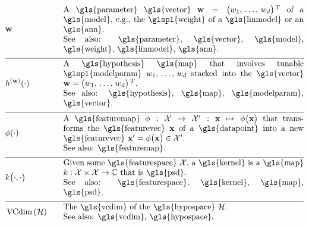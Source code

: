 \begin{align} 
	&\weights  &\quad & \parbox{.85\textwidth}{A \gls{parameter} \gls{vector} $\weights = \big(\weight_{1}, \,\ldots, \,\weight_{\featuredim}\big)\,^{T}$ 
		of a \gls{model}, e.g., the \glspl{weight} of a \gls{linmodel} or an \gls{ann}.
		\\ See also: \gls{parameter}, \gls{vector}, \gls{model}, \gls{weight}, \gls{linmodel}, \gls{ann}. }     \nonumber \\[2mm] \hline \nonumber\\[-5mm]
	&\hypothesis^{(\weights)}(\cdot)  &\quad &\parbox{.85\textwidth}{A \gls{hypothesis} \gls{map} that involves tunable \glspl{modelparam} 
		$\weight_{1}, \,\ldots, \,\weight_{\featuredim}$ stacked into the \gls{vector} $\weights=\big(\weight_{1}, \,\ldots, \,\weight_{\featuredim} \big)\,^{T}$.
		\\ See also: \gls{hypothesis}, \gls{map}, \gls{modelparam}, \gls{vector}. } \nonumber \\[2mm] \hline \nonumber\\[-5mm]
	&\featuremap(\cdot)  &\quad & \parbox{.85\textwidth}{A \gls{featuremap} 
		$\featuremap: \featurespace \rightarrow \featurespace' : \featurevec \mapsto \featuremap\big( \featurevec \big)$ that 
		transforms the \gls{featurevec} $\featurevec$ of a \gls{datapoint} into a new \gls{featurevec} $\featurevec'= \featuremap\big( \featurevec \big) \in \featurespace'$.
		\\ See also: \gls{featuremap}. }   \nonumber \\[2mm] \hline \nonumber\\[-5mm]
	&\kernelmap{\cdot}{\cdot} &\quad & \parbox{.85\textwidth}{Given some \gls{featurespace} $\featurespace$, 
		a \gls{kernel} is a \gls{map} $\kernel: \featurespace \times \featurespace \rightarrow \mathbb{C}$ that is \gls{psd}.
		\\ See also: \gls{featurespace}, \gls{kernel}, \gls{map}, \gls{psd}. }    \nonumber \\[2mm] \hline \nonumber\\[-5mm]  
	&\vcdim{\hypospace} &\quad & \parbox{.85\textwidth}{The \gls{vcdim} of the \gls{hypospace} $\hypospace$. 
		\\ See also: \gls{vcdim}, \gls{hypospace}. }    \nonumber                                                                                                                                               
\end{align}              



